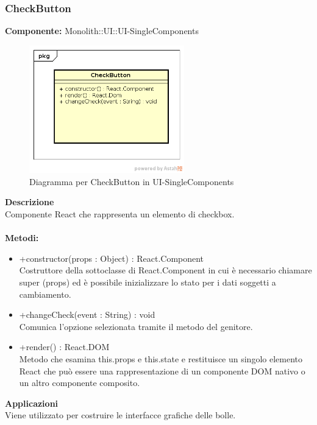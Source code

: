 \subsubsection{CheckButton}
\textbf{Componente:}  Monolith::UI::UI-SingleComponents\\
   \FloatBarrier
   \begin{figure}[ht]
   \centering
   \includegraphics[width=0.6\textwidth]{img/single-CheckButton}
   \caption{{Diagramma per CheckButton in UI-SingleComponents}}
\end{figure}
\FloatBarrier
\textbf{Descrizione}\\
Componente React che rappresenta un elemento di checkbox. \\\\
\textbf{Metodi:} \begin{itemize}\item +constructor(props : Object) : React.Component \\Costruttore della sottoclasse di React.Component in cui è necessario chiamare super (props) ed è possibile inizializzare lo stato per i dati soggetti a cambiamento.\item +changeCheck(event : String) : void  \\Comunica l’opzione selezionata tramite il metodo del genitore. \item +render() : React.DOM \\Metodo che esamina this.props e this.state e restituisce un singolo elemento React che può essere una rappresentazione di un componente DOM nativo o un altro componente composito.\end{itemize} 


\textbf{Applicazioni}\\
Viene utilizzato per costruire le interfacce grafiche delle bolle. 


\clearpage

